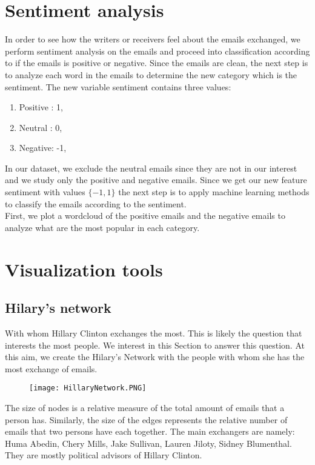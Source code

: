 \documentclass[11pt]{article}
\begin{document}
\section{Sentiment analysis}
In order to see how the writers or receivers feel about the emails exchanged, we perform sentiment analysis on the emails and proceed into classification according to if the emails is positive or negative. Since the emails are clean, the next step is to analyze each word in the emails to determine the new category which is the sentiment. The new variable sentiment contains three values:
\begin{enumerate}
    \item Positive : 1,
    \item Neutral : 0,
    \item Negative: -1,
\end{enumerate}
In our dataset, we exclude the neutral emails since they are not in our interest and we study only the positive and negative emails. Since we get our new feature sentiment with values $\{-1,1\}$ the next step is to apply machine learning methods to classify the emails according to the sentiment.\\

First, we plot a wordcloud of the positive emails and the negative emails to analyze what are the most popular in each category.
\section{Visualization tools}

\subsection{Hilary's network}
With whom Hillary Clinton exchanges the most. This is likely the question that interests the most people. We interest in this Section to answer this question. At this aim, we create the Hilary's Network with the people with whom she has the most exchange of emails.
\begin{figure}[h]
	\centering
	\texttt{[image: HillaryNetwork.PNG]}
\end{figure}
The size of nodes is a relative measure of the total amount of emails that a person has. Similarly, the size of the edges represents the relative number of emails that two persons have each together. The main exchangers are namely: Huma Abedin, Chery Mills, Jake Sullivan, Lauren Jiloty, Sidney Blumenthal. They are mostly political advisors of Hillary Clinton.
\end{document}
